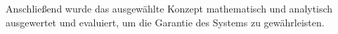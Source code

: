 \documentclass[longdoc,accentcolor=tud1b,11pt,paper=a4]{tudreport}
\newcounter{dummy} %
\begin{document}
	\\
	\\
Anschließend wurde das ausgewählte Konzept mathematisch und analytisch ausgewertet und evaluiert, um die Garantie des Systems zu gewährleisten.
	\tableofcontents
	\cleardoublepage
    


	
\end{document}
